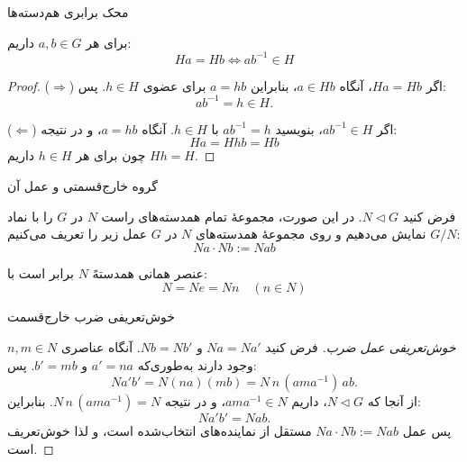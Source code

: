 \begin{frame}[t]{محک برابری هم‌دسته‌ها}
    \begin{remark}
        برای هر $a,b \in G$ داریم:
        \[
            Ha = Hb \iff ab^{-1} \in H
        \]
    \end{remark}

    \begin{proof}
        (\(\Rightarrow\)) اگر \(Ha = Hb\)، آنگاه \(a \in Hb\)، بنابراین \(a = hb\) برای عضوی \(h \in H\). پس:
        \[
            ab^{-1} = h \in H.
        \]

        (\(\Leftarrow\)) اگر \(ab^{-1} \in H\)، بنویسید \(ab^{-1} = h\) با \(h \in H\). آنگاه \(a = hb\)، و در نتیجه:
        \[
            Ha = Hhb = Hb
        \]
        چون برای هر \(h \in H\) داریم \(Hh = H\).
    \end{proof}

\end{frame}


\begin{frame}[t]{گروه خارج‌قسمتی و عمل آن}
    \begin{definition}
        فرض کنید $N \triangleleft G$. در این صورت، مجموعهٔ تمام همدسته‌های راست $N$ در $G$ را با نماد $G / N$ نمایش می‌دهیم و روی مجموعهٔ همدسته‌های $N$ در $G$ عمل زیر را تعریف می‌کنیم:
        \[
            Na \cdot Nb := Nab
        \]

        عنصر همانی همدستهً $N$ برابر است با:
        \[
            N = Ne = Nn \quad (n \in N)
        \]
    \end{definition}

    \end{frame}

\begin{frame}[t]{خوش‌تعریفی ضرب خارج‌قسمت}
    \begin{proof}[خوش‌تعریفی عمل ضرب]
        فرض کنید \(Na = Na'\) و \(Nb = Nb'\). آنگاه عناصری \(n, m \in N\) وجود دارند به‌طوری‌که
        \(a' = na\) و \(b' = mb\). پس:
        \[
            Na'b' = N(na)(mb) = N\,n\,(a m a^{-1})\,ab.
        \]
        از آنجا که \(N \triangleleft G\)، داریم \(a m a^{-1} \in N\)، و در نتیجه
        \(N\,n\,(a m a^{-1}) = N\). بنابراین:
        \[
            Na'b' = N ab.
        \]
        پس عمل \(Na \cdot Nb := Nab\) مستقل از نماینده‌های انتخاب‌شده است،
        و لذا خوش‌تعریف است.
    \end{proof}


\end{frame}


